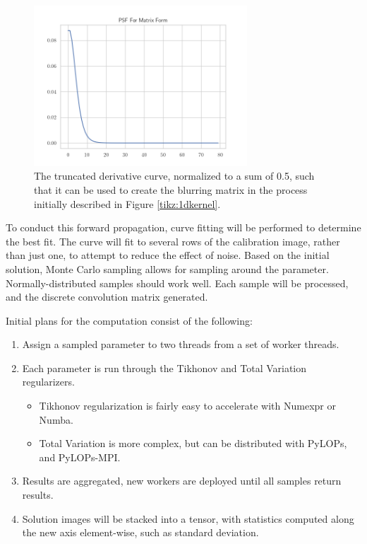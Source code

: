 \documentclass[letterpaper, 10pt, titlepage, twocolumn]{article}
\begin{document}
\begin{figure}[H]
  \centering
  \includegraphics[width=8cm]{matrixpsf.png}
  \caption{The truncated derivative curve, normalized to a sum of 0.5, such that it can be used to create the blurring matrix in the process initially described in Figure \ref{tikz:1dkernel}.}
  \label{fig:psfmatrix}
\end{figure}

To conduct this forward propagation, curve fitting will be performed to determine the best fit. The curve will fit to several rows of the calibration image, rather than just one, to attempt to reduce the effect of noise. Based on the initial solution, Monte Carlo sampling allows for sampling around the parameter. Normally-distributed samples should work well. Each sample will be processed, and the discrete convolution matrix generated.

Initial plans for the computation consist of the following:

\begin{enumerate}
  \item Assign a sampled parameter to two threads from a set of worker threads.
  \item Each parameter is run through the Tikhonov and Total Variation regularizers.\\
    \begin{itemize}
      \vspace*{-0.5em}
      \item Tikhonov regularization is fairly easy to accelerate with Numexpr or Numba.
      \item Total Variation is more complex, but can be distributed with PyLOPs, and PyLOPs-MPI.
    \end{itemize}
  \item Results are aggregated, new workers are deployed until all samples return results.
  \item Solution images will be stacked into a tensor, with statistics computed along the new axis element-wise, such as standard deviation.
\end{enumerate}
\end{document}
